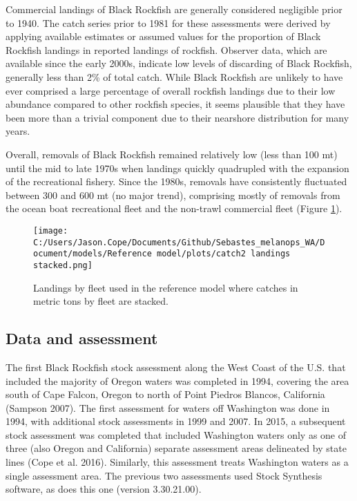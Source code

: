 \documentclass[11pt,
  letterpaper,
]{article}
\begin{document}
Commercial landings of Black Rockfish are generally considered negligible prior to 1940. The catch series prior to 1981 for these assessments were derived by applying available estimates or assumed values for the proportion of Black Rockfish landings in reported landings of rockfish. Observer data, which are available since the early 2000s, indicate low levels of discarding of Black Rockfish, generally less than 2\% of total catch. While Black Rockfish are unlikely to have ever comprised a large percentage of overall rockfish landings due to their low abundance compared to other rockfish species, it seems plausible that they have been more than a trivial component due to their nearshore distribution for many years.

Overall, removals of Black Rockfish remained relatively low (less than 100 mt) until the mid to late 1970s when landings quickly quadrupled with the expansion of the recreational fishery. Since the 1980s, removals have consistently fluctuated between 300 and 600 mt (no major trend), comprising mostly of removals from the ocean boat recreational fleet and the non-trawl commercial fleet (Figure \ref{fig:es-catch}).



\begin{figure}
{\centering
\texttt{[image: C:/Users/Jason.Cope/Documents/Github/Sebastes\_melanops\_WA/Document/models/Reference model/plots/catch2 landings stacked.png]}
}
\caption{Landings by fleet used in the reference model where catches in metric tons by fleet are stacked.\label{fig:es-catch}}
\end{figure}

\clearpage

\hypertarget{data-and-assessment}{%
\subsection*{Data and assessment}\label{data-and-assessment}}

The first Black Rockfish stock assessment along the West Coast of the U.S. that included the majority of Oregon waters was completed in 1994, covering the area south of Cape Falcon, Oregon to north of Point Piedros Blancos, California (Sampson 2007). The first assessment for waters off Washington was done in 1994, with additional stock assessments in 1999 and 2007. In 2015, a subsequent stock assessment was completed that included Washington waters only as one of three (also Oregon and California) separate assessment areas delineated by state lines (Cope et al. 2016). Similarly, this assessment treats Washington waters as a single assessment area. The previous two assessments used Stock Synthesis software, as does this one (version 3.30.21.00).
\end{document}
